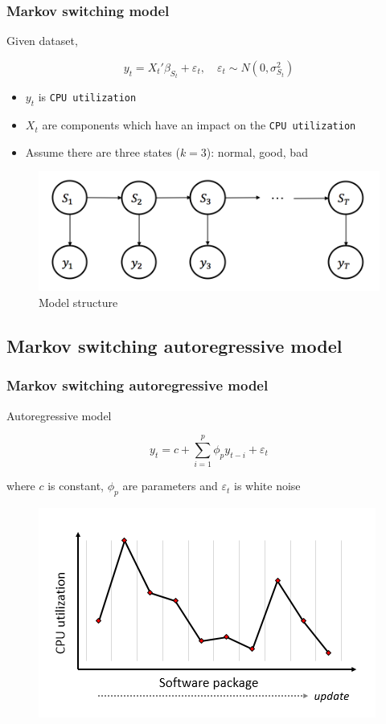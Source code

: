 \documentclass{beamer}
\begin{document}
\begin{frame}
\frametitle{Markov switching model}

Given dataset,

$$y_{t} = {X_{t}}'\beta_{S_{t}} + \varepsilon_{t}, \quad \varepsilon_{t} \sim N(0,\sigma^{2}_{S_{t}})$$

\begin{itemize}
	\item $y_{t}$ is \texttt{CPU utilization}
	\item$X_{t}$ are components which have an impact on the \texttt{CPU utilization}
	\item Assume there are three states ($k=3$): normal, good, bad
\end{itemize}

\begin{figure}
	\includegraphics[width=0.5\linewidth]{msm}
	\caption{Model structure}
\end{figure}

\end{frame}

\subsection{Markov switching autoregressive model} %

\begin{frame}
\frametitle{Markov switching autoregressive model}

Autoregressive model

$$y_{t} = c + \sum_{i=1}^{p}\phi_{p}y_{t-i} + \varepsilon_{t}$$

where $c$ is constant, $\phi_{p}$ are parameters and $\varepsilon_{t}$ is white noise

\begin{figure}
	\includegraphics[width=0.6\linewidth]{inde}
\end{figure}
\end{frame}
\end{document}
